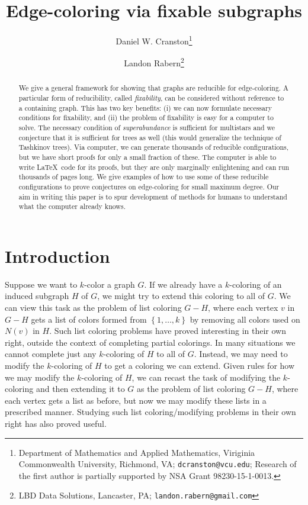 \documentclass[12pt]{article}
\theoremstyle{plain}
\theoremstyle{definition}
\theoremstyle{remark}
\newcommand{\set}[1]{\left\{ #1 \right\}}
\begin{document}
\title{Edge-coloring via fixable subgraphs}
\author{Daniel W. Cranston\thanks{Department of Mathematics and Applied
Mathematics, Viriginia Commonwealth University, Richmond, VA;
\texttt{dcranston@vcu.edu}; 
Research of the first author is partially supported by NSA Grant
98230-15-1-0013.}
\and
Landon Rabern\thanks{LBD Data Solutions, Lancaster, PA;
\texttt{landon.rabern@gmail.com}}
}
\maketitle

\begin{abstract}
We give a general framework for showing that graphs are reducible for
edge-coloring.  A particular form of reducibility, called \emph{fixability},
can be considered without reference to a containing graph.  This has two key
benefits: (i) we can now formulate necessary conditions for fixability, and
(ii) the problem of fixability is easy for a computer to solve. The necessary
condition of \emph{superabundance} is sufficient for multistars and we
conjecture that it is sufficient for trees as well (this would generalize the
technique of Tashkinov trees). Via computer, we can generate thousands of reducible
configurations, but we have short proofs for only a small fraction of these. 
The computer is able to write \LaTeX\ code for its proofs, but they are only
marginally enlightening and can run thousands of pages long.  We give examples
of how to use some of these reducible configurations to prove conjectures on
edge-coloring for small maximum degree.  Our aim in writing this paper
is to spur development of methods for humans to
understand what the computer already knows.
\end{abstract}

\section{Introduction}
Suppose we want to $k$-color a graph $G$. If we already have a $k$-coloring of
an induced subgraph $H$ of $G$, we might try to extend this coloring to all of
$G$.  We can view this task as the problem of list coloring $G-H$, where
each vertex $v$ in $G-H$ gets a list of colors formed from $\set{1, \ldots, k}$
by removing all colors used on $N(v)$ in $H$.  
Such list coloring problems have proved interesting in their own right, outside the
context of completing partial colorings.
In many situations we cannot complete just any $k$-coloring of $H$ to all of
$G$.  Instead, we may need to modify the $k$-coloring of $H$ to get a coloring
we can extend.  Given rules for how we may modify the $k$-coloring
of $H$, we can recast the task of modifying the $k$-coloring and then
extending it to $G$ as the problem of list coloring $G-H$, where each
vertex gets a list as before, but now we may modify these lists in a
prescribed manner.  Studying such list coloring/modifying problems in their own
right has also proved useful.  
\end{document}
